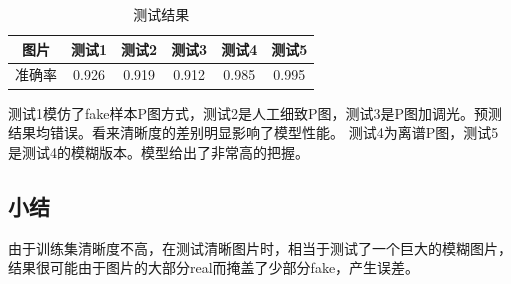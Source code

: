 \documentclass[boldfont,linespread=1.35]{ctexart}
\begin{document}
\begin{table} [h]
	\centering
	\caption{测试结果}
	\begin{tabular}
		{cccccc}
		\toprule[1pt]
		\rowcolor[gray]{0.9} 图片 &测试1 &测试2 &测试3 &测试4 &测试5\\
		\midrule
		准确率   &0.926 &0.919 &0.912 &0.985 &0.995\\
		\bottomrule[1pt]
	\end{tabular}
\end{table}

测试1模仿了fake样本P图方式，测试2是人工细致P图，测试3是P图加调光。预测结果均错误。看来清晰度的差别明显影响了模型性能。
测试4为离谱P图，测试5是测试4的模糊版本。模型给出了非常高的把握。

\subsection{小结}
由于训练集清晰度不高，在测试清晰图片时，相当于测试了一个巨大的模糊图片，结果很可能由于图片的大部分real而掩盖了少部分fake，产生误差。
\end{document}
